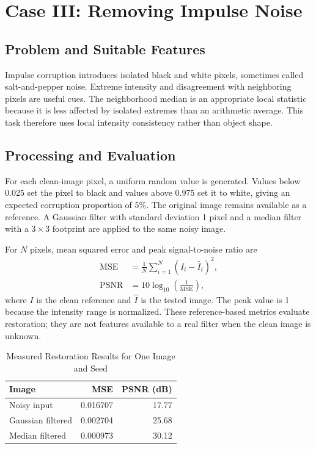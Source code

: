 \documentclass[conference]{IEEEtran}
\begin{document}
\section{Case III: Removing Impulse Noise}
\subsection{Problem and Suitable Features}
Impulse corruption introduces isolated black and white pixels, sometimes called salt-and-pepper noise. Extreme intensity and disagreement with neighboring pixels are useful cues. The neighborhood median is an appropriate local statistic because it is less affected by isolated extremes than an arithmetic average. This task therefore uses local intensity consistency rather than object shape.

\subsection{Processing and Evaluation}
For each clean-image pixel, a uniform random value is generated. Values below 0.025 set the pixel to black and values above 0.975 set it to white, giving an expected corruption proportion of 5\%. The original image remains available as a reference. A Gaussian filter with standard deviation 1 pixel and a median filter with a $3\times3$ footprint are applied to the same noisy image.

For $N$ pixels, mean squared error and peak signal-to-noise ratio are
\begin{align}
\mathrm{MSE}&=\frac{1}{N}\sum_{i=1}^{N}(I_i-\hat I_i)^2,\\
\mathrm{PSNR}&=10\log_{10}\!\left(\frac{1}{\mathrm{MSE}}\right),
\end{align}
where $I$ is the clean reference and $\hat I$ is the tested image. The peak value is 1 because the intensity range is normalized. These reference-based metrics evaluate restoration; they are not features available to a real filter when the clean image is unknown.

\begin{table}[t]
\caption{Measured Restoration Results for One Image and Seed}
\label{tab:noise}
\centering
\begin{tabular}{lrr}
\toprule
Image & MSE & PSNR (dB)\\
\midrule
Noisy input & 0.016707 & 17.77\\
Gaussian filtered & 0.002704 & 25.68\\
Median filtered & 0.000973 & 30.12\\
\bottomrule
\end{tabular}
\end{table}
\end{document}
